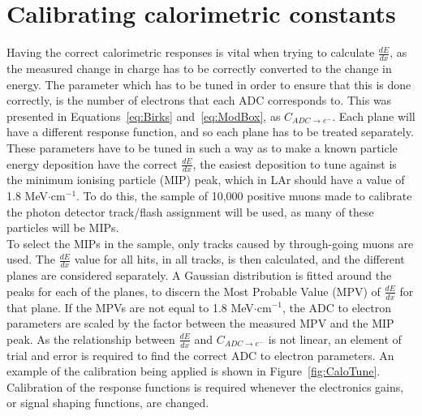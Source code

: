 \section{Calibrating calorimetric constants} \label{sec:MCCalib} %
Having the correct calorimetric responses is vital when trying to calculate $\frac{dE}{dx}$, as the measured change in charge has to be correctly converted to the change in energy. The parameter which has to be tuned in order to ensure that this is done correctly, is the number of electrons that each ADC corresponds to. This was presented in Equations~\ref{eq:Birks} and~\ref{eq:ModBox}, as $C_{ADC \rightarrow e^{-}}$. Each plane will have a different response function, and so each plane has to be treated separately. These parameters have to be tuned in such a way as to make a known particle energy deposition have the correct $\frac{dE}{dx}$, the easiest deposition to tune against is the minimum ionising particle (MIP) peak, which in LAr should have a value of 1.8 MeV$\cdot$cm$^{-1}$. To do this, the sample of 10,000 positive muons made to calibrate the photon detector track/flash assignment will be used, as many of these particles will be MIPs. \\

To select the MIPs in the sample, only tracks caused by through-going muons are used. The $\frac{dE}{dx}$ value for all hits, in all tracks, is then calculated, and the different planes are considered separately. A Gaussian distribution is fitted around the peaks for each of the planes, to discern the Most Probable Value (MPV) of $\frac{dE}{dx}$ for that plane. If the MPVs are not equal to 1.8 MeV$\cdot$cm$^{-1}$, the ADC to electron parameters are scaled by the factor between the measured MPV and the MIP peak. As the relationship between $\frac{dE}{dx}$ and $C_{ADC \rightarrow e^{-}}$ is not linear, an element of trial and error is required to find the correct ADC to electron parameters. An example of the calibration being applied is shown in Figure~\ref{fig:CaloTune}. Calibration of the response functions is required whenever the electronics gains, or signal shaping functions, are changed.

